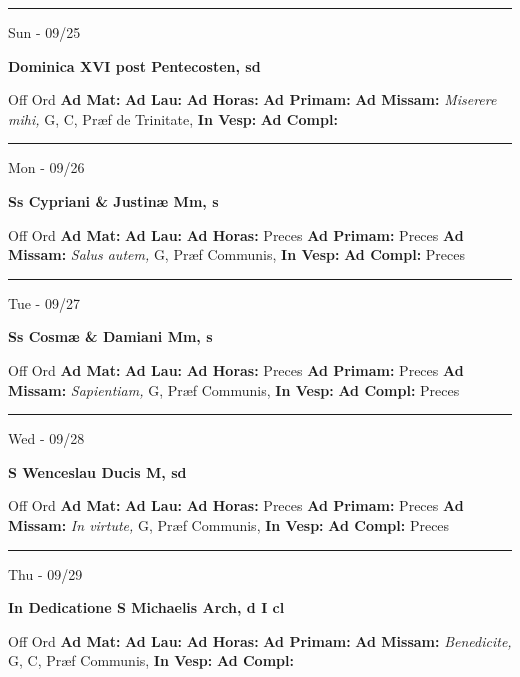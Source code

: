 \documentclass[letterpaper, 10pt]{article}
\begin{document}
\hrule
\begin{center}
Sun - 09/25
\end{center}\textbf{ \large Dominica XVI post Pentecosten, \textnormal{\normalsize sd}}
\begin{justify}
Off Ord
\textbf{Ad Mat: }
\textbf{Ad Lau: }
\textbf{Ad Horas: }
\textbf{Ad Primam: }
\textbf{Ad Missam:} \textit{Miserere mihi, } G, C, Præf de Trinitate, 
\textbf{In Vesp: }
\textbf{Ad Compl: }\end{justify}



\hrule
\begin{center}
Mon - 09/26
\end{center}\textbf{ \large Ss Cypriani \& Justinæ Mm, \textnormal{\normalsize s}}
\begin{justify}
Off Ord
\textbf{Ad Mat: }
\textbf{Ad Lau: }
\textbf{Ad Horas: }Preces
\textbf{Ad Primam: }Preces
\textbf{Ad Missam:} \textit{Salus autem, } G, Præf Communis, 
\textbf{In Vesp: }
\textbf{Ad Compl: }Preces\end{justify}



\hrule
\begin{center}
Tue - 09/27
\end{center}\textbf{ \large Ss Cosmæ \& Damiani Mm, \textnormal{\normalsize s}}
\begin{justify}
Off Ord
\textbf{Ad Mat: }
\textbf{Ad Lau: }
\textbf{Ad Horas: }Preces
\textbf{Ad Primam: }Preces
\textbf{Ad Missam:} \textit{Sapientiam, } G, Præf Communis, 
\textbf{In Vesp: }
\textbf{Ad Compl: }Preces\end{justify}



\hrule
\begin{center}
Wed - 09/28
\end{center}\textbf{ \large S Wenceslau Ducis M, \textnormal{\normalsize sd}}
\begin{justify}
Off Ord
\textbf{Ad Mat: }
\textbf{Ad Lau: }
\textbf{Ad Horas: }Preces
\textbf{Ad Primam: }Preces
\textbf{Ad Missam:} \textit{In virtute, } G, Præf Communis, 
\textbf{In Vesp: }
\textbf{Ad Compl: }Preces\end{justify}



\hrule
\begin{center}
Thu - 09/29
\end{center}\textbf{ \large In Dedicatione S Michaelis Arch, \textnormal{\normalsize d I cl}}
\begin{justify}
Off Ord
\textbf{Ad Mat: }
\textbf{Ad Lau: }
\textbf{Ad Horas: }
\textbf{Ad Primam: }
\textbf{Ad Missam:} \textit{Benedicite, } G, C, Præf Communis, 
\textbf{In Vesp: }
\textbf{Ad Compl: }\end{justify}
\end{document}
